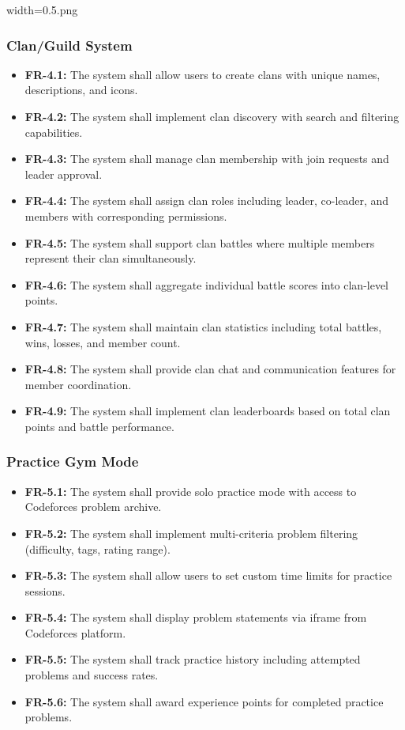 width=0.5\linewidthimage.png\documentclass[12pt,a4paper]{article}
\begin{document}
\subsubsection{Clan/Guild System}
\begin{itemize}
\item \textbf{FR-4.1:} The system shall allow users to create clans with unique names, descriptions, and icons.
\item \textbf{FR-4.2:} The system shall implement clan discovery with search and filtering capabilities.
\item \textbf{FR-4.3:} The system shall manage clan membership with join requests and leader approval.
\item \textbf{FR-4.4:} The system shall assign clan roles including leader, co-leader, and members with corresponding permissions.
\item \textbf{FR-4.5:} The system shall support clan battles where multiple members represent their clan simultaneously.
\item \textbf{FR-4.6:} The system shall aggregate individual battle scores into clan-level points.
\item \textbf{FR-4.7:} The system shall maintain clan statistics including total battles, wins, losses, and member count.
\item \textbf{FR-4.8:} The system shall provide clan chat and communication features for member coordination.
\item \textbf{FR-4.9:} The system shall implement clan leaderboards based on total clan points and battle performance.
\end{itemize}

\subsubsection{Practice Gym Mode}
\begin{itemize}
\item \textbf{FR-5.1:} The system shall provide solo practice mode with access to Codeforces problem archive.
\item \textbf{FR-5.2:} The system shall implement multi-criteria problem filtering (difficulty, tags, rating range).
\item \textbf{FR-5.3:} The system shall allow users to set custom time limits for practice sessions.
\item \textbf{FR-5.4:} The system shall display problem statements via iframe from Codeforces platform.
\item \textbf{FR-5.5:} The system shall track practice history including attempted problems and success rates.
\item \textbf{FR-5.6:} The system shall award experience points for completed practice problems.
\end{itemize}
\end{document}
